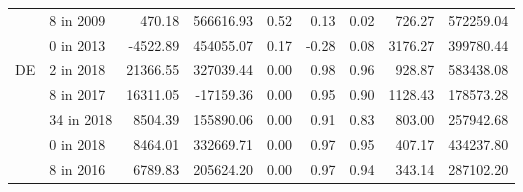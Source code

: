 \begin{tabular}{llrrrrrrr}
   & 8 in 2009 &                                      470.18 &                                       566616.93 &                                          0.52 &                                               0.13 &                                        0.02 &                                             726.27 &                                        572259.04 \\
   & 0 in 2013 &                                    -4522.89 &                                       454055.07 &                                          0.17 &                                              -0.28 &                                        0.08 &                                            3176.27 &                                        399780.44 \\
DE & 2 in 2018 &                                    21366.55 &                                       327039.44 &                                          0.00 &                                               0.98 &                                        0.96 &                                             928.87 &                                        583438.08 \\
   & 8 in 2017 &                                    16311.05 &                                       -17159.36 &                                          0.00 &                                               0.95 &                                        0.90 &                                            1128.43 &                                        178573.28 \\
   & 34 in 2018 &                                     8504.39 &                                       155890.06 &                                          0.00 &                                               0.91 &                                        0.83 &                                             803.00 &                                        257942.68 \\
   & 0 in 2018 &                                     8464.01 &                                       332669.71 &                                          0.00 &                                               0.97 &                                        0.95 &                                             407.17 &                                        434237.80 \\
   & 8 in 2016 &                                     6789.83 &                                       205624.20 &                                          0.00 &                                               0.97 &                                        0.94 &                                             343.14 &                                        287102.20 \\

\end{tabular}
